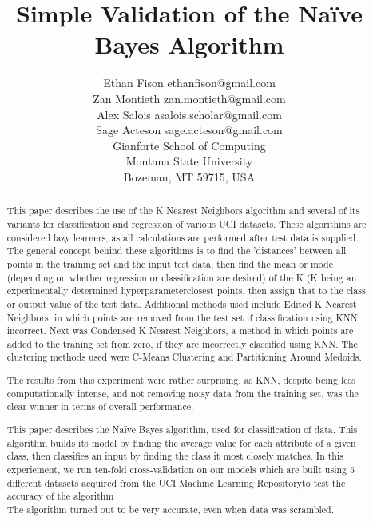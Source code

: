 \documentclass[twoside,11pt]{article}
\begin{document}
\title{Simple Validation of the Naïve Bayes Algorithm}

\author{\name Ethan Fison \email ethanfison@gmail.com \\
        \name Zan Montieth \email zan.montieth@gmail.com \\
        \name Alex Salois \email asalois.scholar@gmail.com \\ 
        \name Sage Acteson \email sage.acteson@gmail.com \\ 
       \addr Gianforte School of Computing\\
       Montana State University\\
       Bozeman, MT 59715, USA}



\maketitle

\begin{abstract}%

This paper describes the use of the K Nearest Neighbors algorithm and several of 
its variants for classification and regression of various UCI datasets. These
algorithms are considered lazy learners, as all calculations are performed after
test data is supplied. The general concept behind these algorithms is to find 
the 'distances' between all points in the training set and the input test data, then
find the mean or mode (depending on whether regression or classification are desired)
of the K (K being an experimentally determined hyperparameterclosest points, then 
assign that to the class or output value of the test data. Additional methods used include 
Edited K Nearest Neighbors, in which points are removed from the test set if classification
using KNN incorrect. Next was Condensed K Nearest Neighbors, a method in which points are
added to the traning set from zero, if they are incorrectly classified using KNN. The 
clustering methods used were C-Means Clustering and Partitioning Around Medoids.

The results from this experiment were rather surprising, as KNN, despite being less computationally
intense, and not removing noisy data from the training set, was the clear winner in terms of 
overall performance.

This paper describes the Na{\"i}ve Bayes algorithm, used for classification
of data. This algorithm builds its model by finding the average value for each
attribute of a given class, then classifies an input by finding the class it 
most closely matches. In this experiement, we run ten-fold cross-validation 
on our models which are built using 5 different datasets acquired from the UCI Machine 
Learning Repositoryto test the accuracy of the algorithm\\
The algorithm turned out to be very accurate, even when data was scrambled.

\end{abstract}
\end{document}

